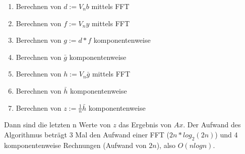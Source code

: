 \documentclass[]{article}
\begin{document}
\begin{enumerate}
	\item Berechnen von $d:=V_nb$ mittels FFT
	\item Berechnen von $f:=V_ny$ mittels FFT
	\item Berechnen von $g:=d*f$ komponentenweise
	\item Berechnen von $\bar{g}$ komponentenweise
	\item Berechnen von $h:= V_n\bar{g}$ mittels FFT
	\item Berechnen von $\bar{h}$ komponentenweise
	\item Berechnen von $z:= \frac{1}{n} \bar{h}$ komponentenweise
\end{enumerate}

Dann sind die letzten n Werte von $z$ das Ergebnis von $Ax$. Der Aufwand des Algorithmus beträgt 3 Mal den Aufwand einer FFT ($2n * log_2 (2n)$) und 4 komponentenweise Rechnungen (Aufwand von $2n$), also $O(n log n)$.
\end{document}
